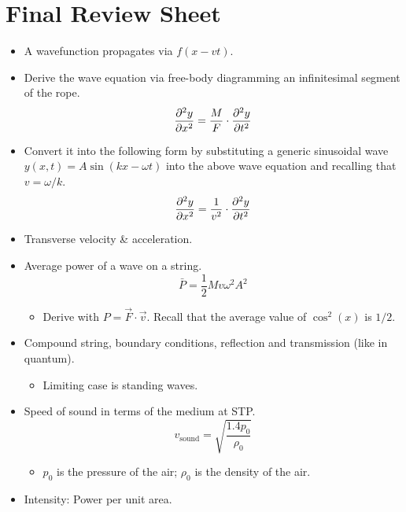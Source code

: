 \documentclass[../notes.tex]{subfiles}
\begin{document}
\section{Final Review Sheet}
\begin{itemize}
    \item {}A wavefunction propagates via $f(x-vt)$.
    \item Derive the wave equation via free-body diagramming an infinitesimal segment of the rope.
    \begin{equation*}
        \pdv[2]{y}{x} = \frac{M}{F}\cdot\pdv[2]{y}{t}
    \end{equation*}
    \item Convert it into the following form by substituting a generic sinusoidal wave $y(x,t)=A\sin(kx-\omega t)$ into the above wave equation and recalling that $v=\omega/k$.
    \begin{equation*}
        \pdv[2]{y}{x} = \frac{1}{v^2}\cdot\pdv[2]{y}{t}
    \end{equation*}
    \item Transverse velocity \& acceleration.
    \item Average power of a wave on a string.
    \begin{equation*}
        \bar{P} = \frac{1}{2}Mv\omega^2A^2
    \end{equation*}
    \begin{itemize}
        \item Derive with $P=\vec{F}\cdot\vec{v}$. Recall that the average value of $\cos^2(x)$ is $1/2$.
    \end{itemize}
    \item Compound string, boundary conditions, reflection and transmission (like in quantum).
    \begin{itemize}
        \item Limiting case is standing waves.
    \end{itemize}
    \item Speed of sound in terms of the medium at STP.
    \begin{equation*}
        v_\text{sound} = \sqrt{\frac{1.4p_0}{\rho_0}}
    \end{equation*}
    \begin{itemize}
        \item $p_0$ is the pressure of the air; $\rho_0$ is the density of the air.
    \end{itemize}
    \item Intensity: Power per unit area.

\end{itemize}
\end{document}
